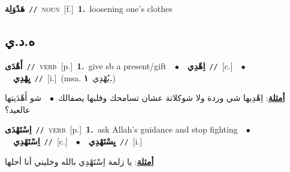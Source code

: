 \documentclass[10pt,a4paper,twoside]{article} %
\begin{document}
\begin{multicols}{2}
{\setlength\topsep{0pt}\textbf{\foreignlanguage{arabic}{هَدْوَلِة}}\ {\color{gray}\texttt{//}\color{black}}\ \textsc{noun}\ [f.]\ \textbf{1.}~loosening one's clothes\ } \vspace{2mm}

\vspace{-3mm}
\subsection*{\color{blue}\foreignlanguage{arabic}{ه.د.ي}\color{blue}{}} 

{\setlength\topsep{0pt}\textbf{\foreignlanguage{arabic}{أَهْدَى}}\ {\color{gray}\texttt{//}\color{black}}\ \textsc{verb}\ [p.]\ \textbf{1.}~give sb a present/gift\ \ $\bullet$\ \ \setlength\topsep{0pt}\textbf{\foreignlanguage{arabic}{اِهْدِي}}\ {\color{gray}\texttt{//}\color{black}}\ [c.]\ \ $\bullet$\ \ \setlength\topsep{0pt}\textbf{\foreignlanguage{arabic}{يِهْدِي}}\ {\color{gray}\texttt{//}\color{black}}\ [i.]\ \color{gray}(msa. \foreignlanguage{arabic}{يُهْدِي}~\foreignlanguage{arabic}{\textbf{١.}})\color{black}\  \begin{flushright}\color{gray}\foreignlanguage{arabic}{\textbf{\underline{\foreignlanguage{arabic}{أمثلة}}}: اِهْدِيها شي وردة ولا شوكلاتة عشان تسامحك وقلبها يصفالك\ $\bullet$\ \  شو أَهْدَيتها عالعيد؟}\end{flushright}\color{black}} \vspace{2mm}

{\setlength\topsep{0pt}\textbf{\foreignlanguage{arabic}{اِسْتَهْدَى}}\ {\color{gray}\texttt{//}\color{black}}\ \textsc{verb}\ [p.]\ \textbf{1.}~ask Allah's guidance and stop fighting\ \ $\bullet$\ \ \setlength\topsep{0pt}\textbf{\foreignlanguage{arabic}{اِسْتَهْدِي}}\ {\color{gray}\texttt{//}\color{black}}\ [c.]\ \ $\bullet$\ \ \setlength\topsep{0pt}\textbf{\foreignlanguage{arabic}{يِسْتَهْدِي}}\ {\color{gray}\texttt{//}\color{black}}\ [i.]\  \begin{flushright}\color{gray}\foreignlanguage{arabic}{\textbf{\underline{\foreignlanguage{arabic}{أمثلة}}}: يا زلمة اِسْتَهْدِي بالله وخليني أنا أحلها}\end{flushright}\color{black}} \vspace{2mm}


\end{multicols}
\end{document}

